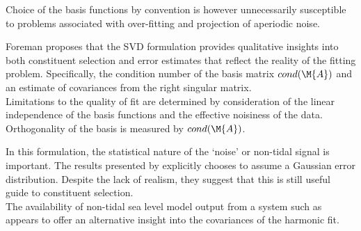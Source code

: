 
Choice of the basis functions by convention is however unnecessarily susceptible to problems associated with over-fitting and projection of aperiodic noise. 

Foreman proposes that the SVD formulation provides qualitative insights into both constituent selection and error estimates that reflect the reality of the fitting problem.  
Specifically, the condition number of the basis matrix $cond(\M{A})$ and an estimate of covariances from the right singular matrix.\\
Limitations to the quality of fit are determined by consideration of the linear independence of the basis functions and the effective noisiness of the data.  
Orthogonality of the basis is measured by $cond(\M{A})$.


In this formulation, the statistical nature of the `noise' or non-tidal signal is important.  
The results presented by \citep{Foreman:2009bg} explicitly chooses to assume a Gaussian error distribution.  Despite the lack of realism, they suggest that this is still useful guide to constituent selection.\\
The availability of non-tidal sea level model output from a system such as \BL{} appears to offer an alternative insight into the covariances of the harmonic fit.




